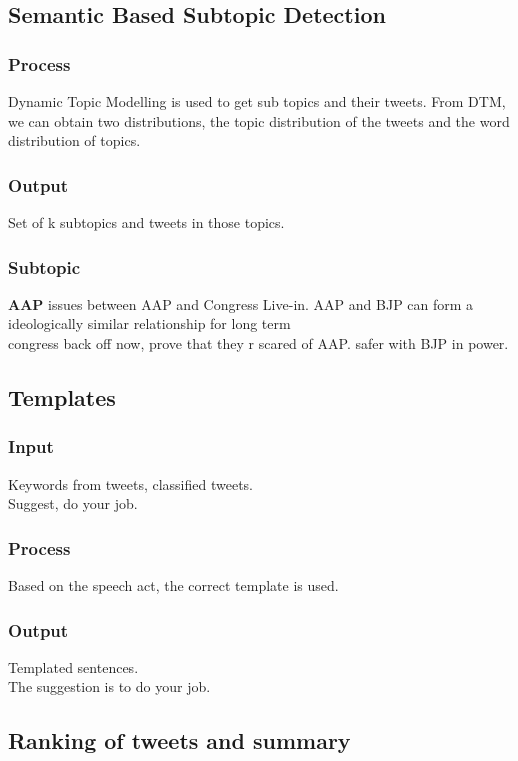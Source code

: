 \documentclass[conference]{IEEEtran}
\begin{document}
\subsection{\textbf{Semantic Based Subtopic Detection}}
\subsubsection{\textbf{Process}}
\par Dynamic Topic Modelling is used to get sub topics and their tweets. From DTM, we can obtain two distributions, the topic distribution of the tweets and the word distribution of topics.

\subsubsection{\textbf{Output}}
Set of k subtopics and tweets in those topics.

\subsubsection{\textbf{Subtopic}}
\textbf{AAP}
issues between AAP and Congress Live-in. AAP and BJP can form a ideologically similar relationship for long term \\
congress back off now,  prove that they r scared of AAP. safer with BJP in power. 

\subsection{\textbf{Templates}}
\subsubsection{\textbf{Input}}
Keywords from tweets, classified tweets.\\
Suggest, do your job.
\subsubsection{\textbf{Process}}
Based on the speech act, the correct template is used.

\subsubsection{\textbf{Output}}
Templated sentences.\\
The suggestion is to do your job.

\subsection{\textbf{Ranking of tweets and summary}}
\end{document}
